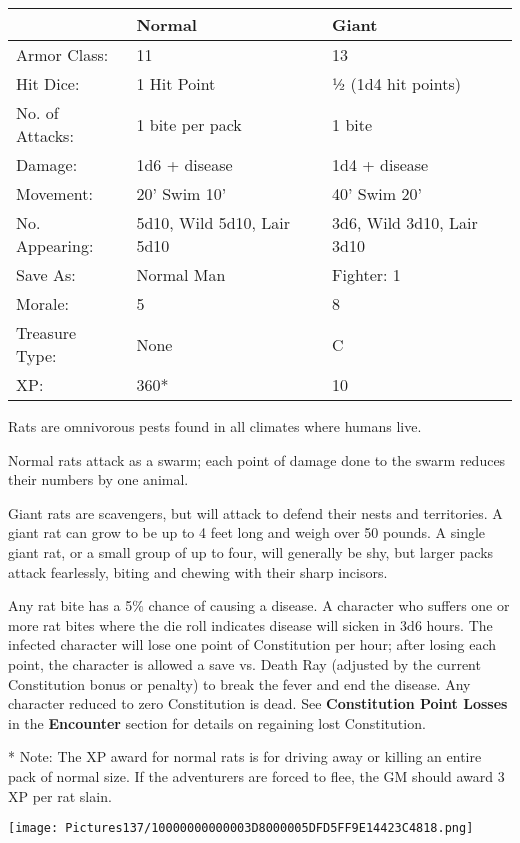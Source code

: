 \documentclass[a4paper,twoside,openany,10pt]{book}
\begin{document}
\begin{multicols}{2}
\begin{tabularx}{0.50\textwidth}{@{}lXX@{}}
& Normal & Giant \\\hline
Armor Class: & 11 & 13 \\\hline
Hit Dice: & 1 Hit Point & ½ (1d4 hit points) \\\hline
No. of Attacks: & 1 bite per pack & 1 bite \\\hline
Damage: & 1d6 + disease & 1d4 + disease \\\hline
Movement: & 20' Swim 10' &
40' Swim 20' \\\hline
No. Appearing: & 5d10, Wild 5d10,  Lair 5d10 & 3d6, Wild 3d10, Lair 3d10 \\\hline
Save As: & Normal Man & Fighter: 1 \\\hline
Morale: & 5 & 8 \\\hline
Treasure Type: & None & C \\\hline
XP: & 360* & 10 \\\hline
\end{tabularx}

Rats are omnivorous pests found in all climates where humans live.

Normal rats attack as a swarm; each point of damage done to the swarm reduces their numbers by one animal.


Giant rats are scavengers, but will attack to defend their nests and territories. A giant rat can grow to be up to 4 feet long and weigh over 50 pounds. A single giant rat, or a small group of up to four, will generally be shy, but larger packs attack fearlessly, biting and chewing with their sharp incisors.

Any rat bite has a 5\% chance of causing a disease. A character who suffers  one or more rat bites where the die roll indicates disease will sicken in 3d6 hours. The infected character will lose one point of Constitution per hour; after losing each point, the character is allowed a save vs. Death Ray (adjusted by the current Constitution bonus or penalty) to break the fever and end the disease. Any character reduced to zero Constitution is dead. See \textbf{Constitution Point Losses} in the \textbf{Encounter} section for details on regaining lost Constitution. 

* Note: The XP award for normal rats is for driving away or killing an entire pack of normal size. If the adventurers are forced to flee, the
GM should award 3 XP per rat slain.

\begin{center}
	\texttt{[image: Pictures137/10000000000003D8000005DFD5FF9E14423C4818.png]}
\end{center}



\end{multicols}
\end{document}
